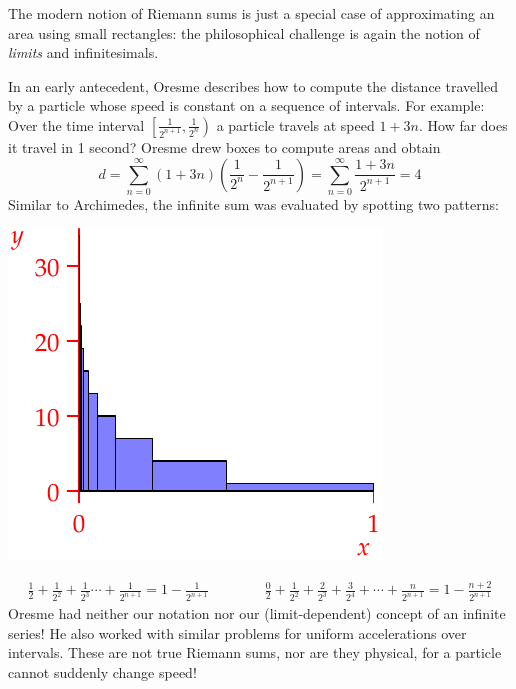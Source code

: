 The modern notion of Riemann sums is just a special case of approximating an area using small rectangles: the philosophical challenge is again the notion of \emph{limits} and infinitesimals.\par
\begin{minipage}[t]{0.58\linewidth}\vspace{-3pt}
	In an early antecedent, Oresme describes how to compute the distance travelled by a particle whose speed is constant on a sequence of intervals. For example:\smallbreak
	Over the time interval $\left[\tfrac 1{2^{n+1}},\tfrac 1{2^n}\right)$ a particle travels at speed $1+3n$. How far does it travel in 1 second?\smallbreak
	Oresme drew boxes to compute areas and obtain
	\[
		d=\sum_{n=0}^\infty(1+3n)\left(\frac 1{2^n}-\frac 1{2^{n+1}}\right) =\sum_{n=0}^\infty \frac{1+3n}{2^{n+1}}=4
	\]
	Similar to Archimedes, the infinite sum was evaluated by spotting two patterns:
\end{minipage}
\hfill
\begin{minipage}[t]{0.4\linewidth}\vspace{-3pt}
	\flushright\includegraphics{analytic-oresme}
\end{minipage}\par
\begin{gather*}
	\frac 12+\frac 1{2^2}+\frac 1{2^3}\cdots+\frac 1{2^{n+1}}=1-\frac 1{2^{n+1}}
	\qquad\qquad
	\frac 02+\frac 1{2^2}+\frac 2{2^3}+\frac 3{2^4}+\cdots+\frac n{2^{n+1}}=1-\frac{n+2}{2^{n+1}}
\end{gather*}
Oresme had neither our notation nor our (limit-dependent) concept of an infinite series! He also worked with similar problems for uniform accelerations over intervals. These are not true Riemann sums, nor are they physical, for a particle cannot suddenly change speed!
\goodbreak


